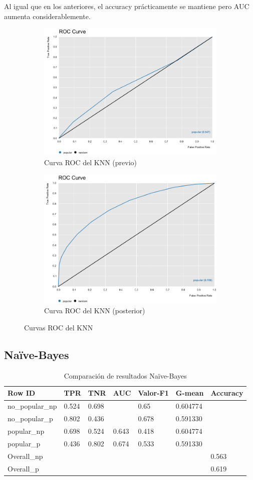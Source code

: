 Al igual que en los anteriores, el accuracy prácticamente se mantiene pero AUC aumenta considerablemente.

\begin{figure}[H]
	\begin{subfigure}{.5\textwidth}
		\centering
		\includegraphics[width=.4\linewidth]{roc-knn-p.png}
		\caption{Curva ROC del KNN (previo)}
		\label{fig:rcknnp}
	\end{subfigure}%
	\begin{subfigure}{.5\textwidth}
		\centering
		\includegraphics[width=.4\linewidth]{roc-knn.png}
		\caption{Curva ROC del KNN (posterior)}
		\label{fig:rcknn}
	\end{subfigure}
	\caption{Curvas ROC del KNN}
	\label{fig:bknn}
\end{figure}

\subsection{Naïve-Bayes}

\begin{table}[H]
	\centering
	\begin{tabular}{|l|l|l|l|l|l|l|}
		\hline
		Row ID          & TPR   & TNR   & AUC   & Valor-F1 & G-mean   & Accuracy \\ \hline
		no\_popular\_np & 0.524 & 0.698 &       & 0.65     & 0.604774 &          \\ \hline
		no\_popular\_p  & 0.802 & 0.436 &       & 0.678    & 0.591330 &          \\ \hline
		popular\_np     & 0.698 & 0.524 & 0.643 & 0.418    & 0.604774 &          \\ \hline
		popular\_p      & 0.436 & 0.802 & 0.674 & 0.533    & 0.591330 &          \\ \hline
		Overall\_np     &       &       &       &          &          & 0.563    \\ \hline
		Overall\_p      &       &       &       &          &          & 0.619    \\ \hline
	\end{tabular}
	\caption{Comparación de resultados Naïve-Bayes}
	\label{tab:compnb}
\end{table}

